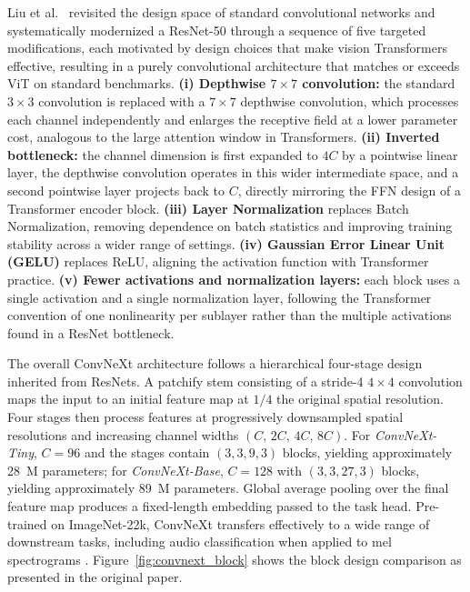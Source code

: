 Liu et al.\ \cite{liu2022convnext} revisited the design space of standard convolutional networks and systematically modernized a ResNet-50 through a sequence of five targeted modifications, each motivated by design choices that make vision Transformers effective, resulting in a purely convolutional architecture that matches or exceeds ViT on standard benchmarks. \textbf{(i) Depthwise $7\!\times\!7$ convolution:} the standard $3\!\times\!3$ convolution is replaced with a $7\!\times\!7$ depthwise convolution, which processes each channel independently and enlarges the receptive field at a lower parameter cost, analogous to the large attention window in Transformers. \textbf{(ii) Inverted bottleneck:} the channel dimension is first expanded to $4C$ by a pointwise linear layer, the depthwise convolution operates in this wider intermediate space, and a second pointwise layer projects back to $C$, directly mirroring the FFN design of a Transformer encoder block. \textbf{(iii) Layer Normalization} replaces Batch Normalization, removing dependence on batch statistics and improving training stability across a wider range of settings. \textbf{(iv) Gaussian Error Linear Unit (GELU)} replaces ReLU, aligning the activation function with Transformer practice. \textbf{(v) Fewer activations and normalization layers:} each block uses a single activation and a single normalization layer, following the Transformer convention of one nonlinearity per sublayer rather than the multiple activations found in a ResNet bottleneck.

\par \vspace{0.3cm}

\noindent The overall ConvNeXt architecture follows a hierarchical four-stage design inherited from ResNets. A patchify stem consisting of a stride-4 $4\!\times\!4$ convolution maps the input to an initial feature map at $1/4$ the original spatial resolution. Four stages then process features at progressively downsampled spatial resolutions and increasing channel widths $(C,\,2C,\,4C,\,8C)$. For \textit{ConvNeXt-Tiny}, $C = 96$ and the stages contain $(3, 3, 9, 3)$ blocks, yielding approximately 28~M parameters; for \textit{ConvNeXt-Base}, $C = 128$ with $(3, 3, 27, 3)$ blocks, yielding approximately 89~M parameters. Global average pooling over the final feature map produces a fixed-length embedding passed to the task head. Pre-trained on ImageNet-22k, ConvNeXt transfers effectively to a wide range of downstream tasks, including audio classification when applied to mel spectrograms \cite{pellegrini2023convnext}. Figure~\ref{fig:convnext_block} shows the block design comparison as presented in the original paper.

